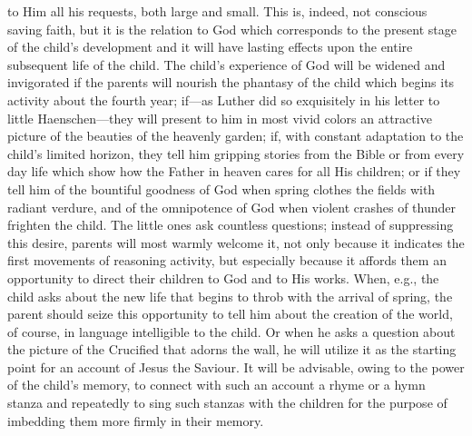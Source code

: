 to Him all his requests, both large and small. This is, indeed, not conscious saving faith, but it is the relation to God which corresponds to the present stage of the child’s development and it will have lasting effects upon the entire subsequent life of the child. The child’s experience of God will be widened and invigorated if the parents will nourish the phantasy of the child which begins its activity about the fourth year; if—as Luther did so exquisitely in his letter to little Haenschen—they will present to him in most vivid colors an attractive picture of the beauties of the heavenly garden; if, with constant adaptation to the child’s limited horizon, they tell him gripping stories from the Bible or from every day life which show how the Father in heaven cares for all His children; or if they tell him of the bountiful goodness of God when spring clothes the fields with radiant verdure, and of the omnipotence of God when violent crashes of thunder frighten the child. The little ones ask countless questions; instead of suppressing this desire, parents will most warmly welcome it, not only because it indicates the first movements of reasoning activity, but especially because it affords them an opportunity to direct their children to God and to His works. When, e.g., the child asks about the new life that begins to throb with the arrival of spring, the parent should seize this opportunity to tell him about the creation of the world, of course, in language intelligible to the child. Or when he asks a question about the picture of the Crucified that adorns the wall, he will utilize it as the starting point for an account of Jesus the Saviour. It will be advisable, owing to the power of the child’s memory, to connect with such an account a rhyme or a hymn stanza and repeatedly to sing such stanzas with the children for the purpose of imbedding them more firmly in their memory.


